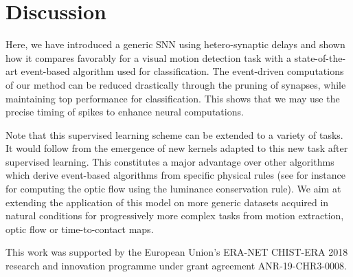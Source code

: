 \documentclass[default]{sn-jnl}%
\theoremstyle{thmstyleone}%
\theoremstyle{thmstyletwo}%
\theoremstyle{thmstylethree}%
\newcommand{\citep}[1]{\cite{#1}}
\begin{document}
\section{Discussion}

Here, we have introduced a generic SNN using hetero-synaptic delays and shown how it compares favorably for a visual motion detection task with a state-of-the-art event-based algorithm used for classification. The event-driven computations of our method can be reduced drastically through the pruning of synapses, while maintaining top performance for classification. This shows that we may use the precise timing of spikes to enhance neural computations. 


Note that this supervised learning scheme can be extended to a variety of tasks. It would follow from the emergence of new kernels adapted to this new task after supervised learning.  This constitutes a major advantage over other algorithms which derive event-based algorithms from specific physical rules (see for instance~\citep{Benosman12} for computing the optic flow using the luminance conservation rule). We aim at extending the application of this model on more generic datasets acquired in natural conditions for progressively more complex tasks from motion extraction, optic flow or time-to-contact maps.
%

\backmatter


This work was supported by the European Union’s ERA-NET CHIST-ERA 2018 research and innovation programme under grant agreement ANR-19-CHR3-0008.
\end{document}
